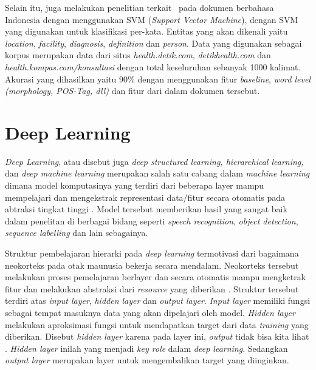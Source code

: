 Selain itu, \cite{suwarningsih2014imner} juga melakukan penelitian terkait \mer~pada dokumen berbahasa Indonesia dengan menggunakan SVM (\textit{Support Vector Machine}), dengan SVM yang digunakan untuk klasifikasi per-kata. Entitas yang akan dikenali yaitu \textit{location}, \textit{facility}, \textit{diagnosis}, \textit{definition} dan \textit{person}. Data yang digunakan sebagai korpus merupakan data dari situs \textit{health.detik.com}, \textit{detikhealth.com} dan \textit{health.kompas.com/konsultasi} dengan total keseluruhan sebanyak 1000 kalimat. Akurasi yang dihasilkan yaitu $ 90\% $ dengan menggunakan fitur \textit{baseline}, \textit{word level (morphology, POS-Tag, dll)} dan fitur dari dalam dokumen tersebut.

\section{Deep Learning}
\textit{Deep Learning}, atau disebut juga \textit{deep structured learning, hierarchical learning,} dan \textit{deep machine learning} merupakan salah satu cabang dalam \textit{machine learning} dimana model komputasinya yang terdiri dari beberapa layer mampu mempelajari dan mengekstrak representasi data/fitur secara otomatis pada abtraksi tingkat tinggi \citep{lecun2015deep}. Model tersebut memberikan hasil yang sangat baik dalam penelitan di berbagai bidang seperti \textit{speech recognition}, \textit{object detection}, \textit{sequence labelling} dan lain sebagainya.  

Struktur pembelajaran hierarki pada \textit{deep learning} termotivasi dari bagaimana neokorteks pada otak maunusia bekerja secara mendalam. Neokorteks tersebut melakukan proses pemelajaran berlayer dan secara otomatis mampu mengketrak fitur dan melakukan abstraksi dari \textit{resource} yang diberikan \citep{bengio2007scaling}. Struktur tersebut terdiri atas \textit{input layer}, \textit{hidden layer} dan \textit{output layer}. \textit{Input layer} memiliki fungsi sebagai tempat masuknya data yang akan dipelajari oleh model. \textit{Hidden layer} melakukan aproksimasi fungsi untuk mendapatkan target dari data \textit{training} yang diberikan. Disebut \textit{hidden layer} karena pada layer ini, \textit{output} tidak bisa kita lihat \citep{Goodfellow-et-al-2016-Book}. \textit{Hidden layer} inilah yang menjadi \textit{key role} dalam \textit{deep learning}. Sedangkan \textit{output layer} merupakan layer untuk mengembalikan target yang diinginkan.

